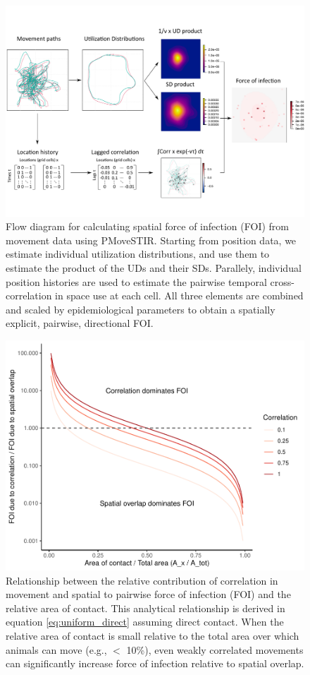\documentclass[letterpaper]{article}
\begin{document}
 \begin{figure}
     \includegraphics[width=\textwidth]{figures/steps_diagram.pdf}
     \caption{Flow diagram for calculating spatial force of infection (FOI) from movement data using PMoveSTIR. Starting from position data, we estimate individual utilization distributions, and use them to estimate the product of the UDs and their SDs. Parallely, individual position histories are used to estimate the pairwise temporal cross-correlation in space use at each cell. All three elements are combined and scaled by epidemiological parameters to obtain a spatially explicit, pairwise, directional FOI. }
 	\label{fig:steps}
 \end{figure}

\begin{figure}
    \includegraphics[width=\textwidth]{figures/correlation_analytical_figure.pdf}
    \caption{Relationship between the relative contribution of correlation in movement and spatial to pairwise force of infection (FOI) and the relative area of contact. This analytical relationship is derived in equation \ref{eq:uniform_direct} assuming direct contact.  When the relative area of contact is small relative to the total area over which animals can move (e.g., $<$ 10\%), even weakly correlated movements can significantly increase force of infection relative to spatial overlap.}
    \label{fig:analytical_corr}
\end{figure}
\end{document}

